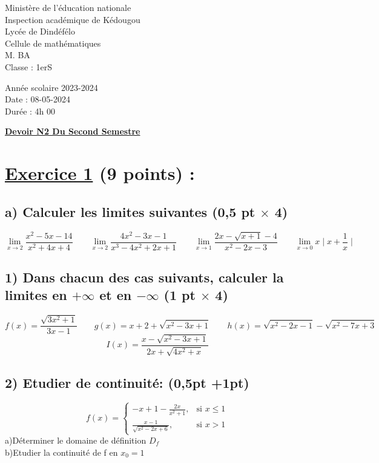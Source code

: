 \documentclass{article}
\begin{document}
\begin{minipage}{0.7\textwidth}
	Ministère de l'éducation nationale  \\
	Inspection académique de Kédougou   \\
	Lycée de Dindéfélo            \\
	Cellule de mathématiques            \\
	M. BA                          \\
	Classe : 1erS  \\
\end{minipage}
\begin{minipage}{0.5\textwidth}
	Année scolaire 2023-2024 \\
	Date : 08-05-2024 \\
	Durée : 4h 00 \\
\end{minipage}

\begin{center}
	\textbf{{\underline{Devoir N2 Du Second Semestre}}}
\end{center}

\section*{\underline{Exercice 1} (9 points) :}
\subsection*{a) Calculer les limites suivantes (0,5 pt $\times$ 4)}
\[ \lim_{x \to 2}\frac{x^{2}-5x-14}{x^{2}+4x+4}\quad\quad 
\lim_{x \to 2}\frac{4x^{2}-3x-1}{x^{3}-4x^{2}+2x+1}\quad\quad 
\lim_{x \to 1}\frac{2x-\sqrt{x+1}-4}{x^{2}-2x-3}\quad\quad 
\lim_{x \to 0}x\mid x+\frac{1}{x}\mid\]
\subsection*{1) Dans chacun des cas suivants, calculer la limites en $+\infty$ et en $-\infty$ (1 pt $\times$ 4)}
\[ f(x)=\frac{\sqrt{3x^{2}+1}}{3x-1}\quad\quad 
g(x)=x+2+\sqrt{x^{2}-3x+1}\quad\quad 
h(x)=\sqrt{x^{2}-2x-1}-\sqrt{x^{2}-7x+3} \]
\[I(x)=\frac{x-\sqrt{x^{2}-3x+1}}{2x+\sqrt{4x^{2}+x}} \]
\subsection*{2) Etudier de continuité: (0,5pt +1pt)}
\[ f(x) = \begin{cases} 
  -x+1-\frac{2x}{x^{2}+1}, & \text{si } x \leq 1 \\
  \frac{x-1}{\sqrt{x^{2}-2x+6}}, & \text{si } x > 1
\end{cases} \]
a)Déterminer le domaine de définition $D_{f}$\\
b)Etudier la continuité de f en $x_{0}=1$
\end{document}
